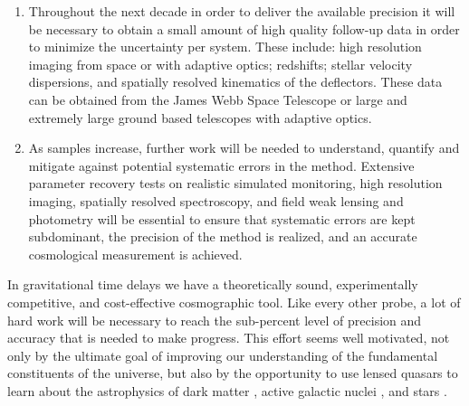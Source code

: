 \begin{enumerate}
%
\item Throughout the next decade in order to deliver the
available precision it will be necessary to obtain a small amount of
high quality follow-up data in order to minimize the uncertainty per
system. These include: high resolution imaging from space or with
adaptive optics; redshifts; stellar velocity dispersions, and
spatially resolved kinematics of the deflectors. These data can be
obtained from the James Webb Space Telescope or large and extremely
large ground based telescopes with adaptive optics.
%
%
\item  
As samples increase, further work will be needed to
understand, quantify and mitigate against potential systematic errors
in the method. Extensive parameter recovery tests on realistic
simulated monitoring, high resolution imaging, spatially resolved
spectroscopy, and field weak lensing and photometry will be essential
to ensure that systematic errors are kept subdominant, the precision
of the method is realized, and an accurate cosmological measurement
is achieved.
\end{enumerate}


In gravitational time delays we have a theoretically sound,
experimentally competitive, and cost-effective cosmographic tool.
Like every other probe, a lot of hard work will be necessary to reach
the sub-percent level of precision and accuracy that is needed to make
progress. This effort seems well motivated, not only by the ultimate
goal of improving our understanding of the fundamental constituents of
the universe, but also by the opportunity to use lensed quasars to
learn about the astrophysics of dark matter
\citep{M+M01,D+K02,Metcalf:2005p1203,Xu++09,Veg++14,Nie++14}, active galactic
nuclei \citep{PMK08,Eig++08a,Eig++08b,Blackburne:2010p6600,Mac++15},
and stars
\citep{Sch++14}.

